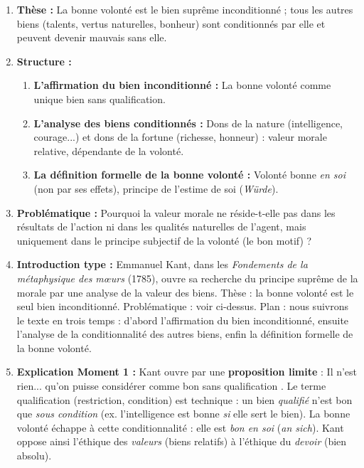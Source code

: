 \documentclass[11pt]{article}
\newcommand{\cle}[1]{{\popxbold\color{popdark}#1}}
\begin{document}
\begin{corrige}
\begin{enumerate}
    \item \textbf{Thèse :} La \cle{bonne volonté} est le bien suprême inconditionné ; tous les autres biens (talents, vertus naturelles, bonheur) sont conditionnés par elle et peuvent devenir mauvais sans elle.
    \item \textbf{Structure :}
    \begin{enumerate}
        \item \textbf{L'affirmation du bien inconditionné :} La bonne volonté comme unique bien sans qualification.
        \item \textbf{L'analyse des biens conditionnés :} Dons de la nature (intelligence, courage...) et dons de la fortune (richesse, honneur) : valeur morale relative, dépendante de la volonté.
        \item \textbf{La définition formelle de la bonne volonté :} Volonté bonne \emph{en soi} (non par ses effets), principe de l'estime de soi (\emph{Würde}).
    \end{enumerate}
    \item \textbf{Problématique :} \guillemotleft Pourquoi la valeur morale ne réside-t-elle pas dans les résultats de l'action ni dans les qualités naturelles de l'agent, mais uniquement dans le principe subjectif de la volonté (le bon motif) ? \guillemotright
    \item \textbf{Introduction type :} Emmanuel Kant, dans les \emph{Fondements de la métaphysique des mœurs} (1785), ouvre sa recherche du principe suprême de la morale par une analyse de la valeur des biens. Thèse : la bonne volonté est le seul bien inconditionné. Problématique : voir ci-dessus. Plan : nous suivrons le texte en trois temps : d'abord l'affirmation du bien inconditionné, ensuite l'analyse de la conditionnalité des autres biens, enfin la définition formelle de la bonne volonté.
    \item \textbf{Explication Moment 1 :} Kant ouvre par une \textbf{proposition limite} : \guillemotleft Il n'est rien... qu'on puisse considérer comme bon sans qualification \guillemotright. Le terme \cle{qualification} (restriction, condition) est technique : un bien \emph{qualifié} n'est bon que \emph{sous condition} (ex. l'intelligence est bonne \emph{si} elle sert le bien). La \cle{bonne volonté} échappe à cette conditionnalité : elle est \emph{bon en soi} (\emph{an sich}). Kant oppose ainsi l'éthique des \emph{valeurs} (biens relatifs) à l'éthique du \emph{devoir} (bien absolu).
\end{enumerate}
\end{corrige}
\end{document}
